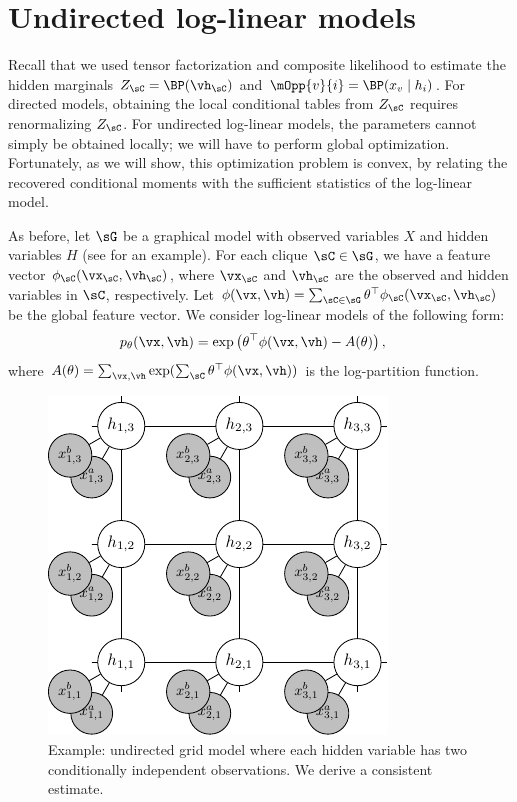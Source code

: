 \section{Undirected log-linear models}
\label{sec:undirected}

Recall that we used tensor factorization and composite likelihood
to estimate the hidden marginals $Z_\sC = \BP(\vh_\sC)$ and $\mOpp{v}{i} = \BP(x_v \mid h_i)$.
For directed models, obtaining the local conditional tables from $Z_\sC$ requires
renormalizing $Z_\sC$.
For undirected log-linear models, the parameters cannot simply be obtained locally;
we will have to perform global optimization.
Fortunately, as we will show, this optimization problem is convex,
by relating the recovered conditional moments with the sufficient statistics of
the log-linear model.

As before, let $\sG$ be a graphical model with observed variables $X$ and hidden variables $H$
(see  for an example).
For each clique $\sC \in \sG$, we have a feature vector $\phi_\sC(\vx_\sC, \vh_\sC)$,
where $\vx_\sC$ and $\vh_\sC$ are the observed and hidden variables in $\sC$, respectively.
Let $\phi(\vx, \vh) = \sum_{\sC \in \sG} \theta^\top \phi_\sC(\vx_\sC,\vh_\sC)$ be the global feature vector.
We consider log-linear models of the following form:
\begin{align}
p_\theta(\vx, \vh) &= \exp\left( \theta^\top \phi(\vx,\vh) - A(\theta) \right),
\end{align}
where $A(\theta) = \sum_{\vx, \vh}  \exp( \sum_\sC \theta^\top \phi(\vx,\vh) )$ is the log-partition function.

\begin{figure}
  \label{fig:examples-mrf}
  \centering
  \includegraphics[width=0.6\columnwidth]{figures/mrf.pdf}
  \caption{Example: undirected grid model where each hidden variable has two
  conditionally independent observations.
  We derive a consistent estimate.}
\end{figure}

